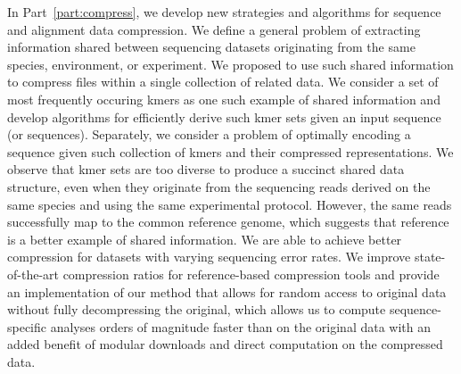 \documentclass[12pt]{cmuthesis}
\begin{document}
In Part~\ref{part:compress}, we develop new strategies and algorithms for sequence and alignment data compression. We define a general problem of extracting information shared between sequencing datasets originating from the same species, environment, or experiment. We proposed to use such shared information to compress files within a single collection of related data. We consider a set of most frequently occuring kmers as one such example of shared information and develop algorithms for efficiently derive such kmer sets given an input sequence (or sequences). Separately, we consider a problem of optimally encoding a sequence given such collection of kmers and their compressed representations. We observe that kmer sets are too diverse to produce a succinct shared data structure, even when they originate from the sequencing reads derived on the same species and using the same experimental protocol. However, the same reads successfully map to the common reference genome, which suggests that reference is a better example of shared information. We are able to achieve better compression for datasets with varying sequencing error rates. We improve state-of-the-art compression ratios for reference-based compression tools and provide an implementation of our method that allows for random access to original data without fully decompressing the original, which allows us to compute sequence-specific analyses orders of magnitude faster than on the original data with an added benefit of modular downloads and direct computation on the compressed data.







\end{document}

